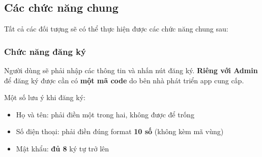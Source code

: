 \subsection{Các chức năng chung}
Tất cả các đối tượng sẽ có thể thực hiện được các chức năng chung sau:
\subsubsection{Chức năng đăng ký}
Người dùng sẽ phải nhập các thông tin và nhấn nút đăng ký. \textbf{Riêng với Admin} để đăng ký được cần có \textbf{một mã code} do bên nhà phát triển app cung cấp.

Một số lưu ý khi đăng ký:

\begin{adjustwidth}{1.5em}{}
  \begin{itemize}
    \item Họ và tên: phải điền một trong hai, không được để trống
    \item Số điện thoại: phải điền đúng format \textbf{10 số} (không kèm mã vùng)
    \item Mật khẩu: \textbf{đủ 8} ký tự trở lên
  \end{itemize}
\end{adjustwidth}
